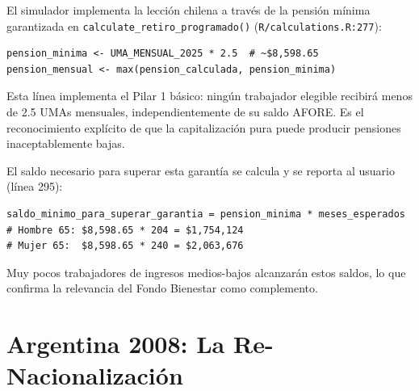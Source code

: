 \documentclass[11pt,a4paper]{report}
\begin{document}
\begin{tcolorbox}[colback=orange!5!white, colframe=orange!75!black, title=\textbf{Aplicaci\'on en C\'odigo: Lecci\'on Reflejada en la Pensi\'on M\'inima Garantizada}]
El simulador implementa la lecci\'on chilena a trav\'es de la pensi\'on m\'inima garantizada en \texttt{calculate\_retiro\_programado()} (\texttt{R/calculations.R:277}):

\begin{lstlisting}
pension_minima <- UMA_MENSUAL_2025 * 2.5  # ~$8,598.65
pension_mensual <- max(pension_calculada, pension_minima)
\end{lstlisting}

Esta l\'inea implementa el Pilar 1 b\'asico: ning\'un trabajador elegible recibir\'a menos de 2.5 UMAs mensuales, independientemente de su saldo AFORE. Es el reconocimiento expl\'icito de que la capitalizaci\'on pura puede producir pensiones inaceptablemente bajas.

El saldo necesario para superar esta garant\'ia se calcula y se reporta al usuario (l\'inea 295):
\begin{lstlisting}
saldo_minimo_para_superar_garantia = pension_minima * meses_esperados
# Hombre 65: $8,598.65 * 204 = $1,754,124
# Mujer 65:  $8,598.65 * 240 = $2,063,676
\end{lstlisting}

Muy pocos trabajadores de ingresos medios-bajos alcanzar\'an estos saldos, lo que confirma la relevancia del Fondo Bienestar como complemento.
\end{tcolorbox}


\section{Argentina 2008: La Re-Nacionalizaci\'on}
\end{document}
